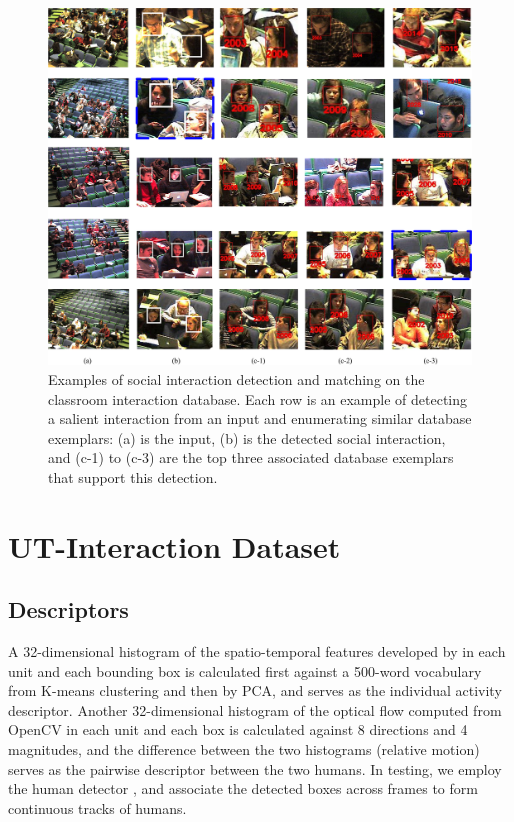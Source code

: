 \documentclass[10pt,twocolumn,letterpaper]{article}
\begin{document}
\begin{figure}
\begin{center}
\includegraphics[scale=2.25]{retrieved.png}
\end{center}
\vspace{-10pt}
\caption{Examples of social interaction detection and matching on the classroom interaction database. Each row is an example of detecting a salient interaction from an input and enumerating similar database exemplars: (a) is the input, (b) is the detected social interaction, and (c-1) to (c-3) are the top three associated database exemplars that support this detection.}
\label{retrieved}
\end{figure}

\section{UT-Interaction Dataset}

\subsection{Descriptors}

A 32-dimensional histogram of the spatio-temporal features developed by \cite{Dollar:STIP} in each unit and each bounding box is calculated first against a 500-word vocabulary from K-means clustering and then by PCA, and serves as the individual activity descriptor. Another 32-dimensional histogram of the optical flow computed from OpenCV in each unit and each box is calculated against 8 directions and 4 magnitudes, and the difference between the two histograms (relative motion) serves as the pairwise descriptor between the two humans. In testing, we employ the human detector \cite{Pedro:detect}, and associate the detected boxes across frames to form continuous tracks of humans. 
\end{document}
